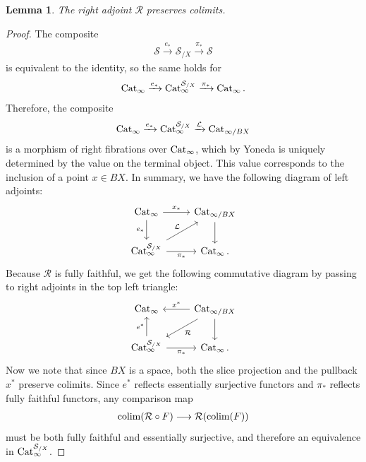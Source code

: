 \documentclass[10pt]{amsart}
\numberwithin{equation}{section}
\newtheorem{lem}[prop]{Lemma}
\theoremstyle{definition}
\DeclareMathOperator*{\colim}{colim}
\newcommand{\Cat}{\mathrm{Cat}\vphantom{t}}
\newcommand{\cS}{\mathcal{S}}
\newcommand{\cL}{\mathcal{L}}
\newcommand{\cR}{\mathcal{R}}
\renewcommand{\to}{\mathchoice{\longrightarrow}{\rightarrow}{}{}}
\begin{document}
	\begin{lem}\label{lem:monoid_right_adjoint_2}
		The right adjoint $\cR$ preserves colimits.
	\end{lem}
	\begin{proof}
		The composite
		\begin{align*}
			\cS \xrightarrow{e_{*}} \cS_{/X} \xrightarrow{\pi_{*}} \cS
		\end{align*}
		is equivalent to the identity, so the same holds for
		\begin{align*}
			\Cat_{\infty}\xrightarrow{e_{*}} \Cat_{\infty}^{\cS_{/X}} \xrightarrow{\pi_{*}} \Cat_{\infty} \,.
		\end{align*}
		Therefore, the composite
		\begin{align*}
			\Cat_{\infty} \xrightarrow{e_{*}} \Cat_{\infty}^{\cS_{/X}} \xrightarrow{\cL} \Cat_{\infty /BX}
		\end{align*}
		is a morphism of right fibrations over $\Cat_{\infty}$, which by Yoneda is uniquely determined by the value on the terminal object.
    This value corresponds to the inclusion of a point $x\in BX$.
    In summary, we have the following diagram of left adjoints:
		\begin{equation*}
			\begin{tikzcd}
				\Cat_{\infty} \arrow[r, "x_{*}"] \arrow[d, "e_{*}"']      &   \Cat_{\infty /BX}  \arrow[d] \\
				\Cat_{\infty}^{\cS_{/X}}  \arrow[r, "\pi_{*}"']    \arrow[ur, "\cL"]           &  \Cat_{\infty} \,.
			\end{tikzcd}
		\end{equation*}
		Because $\cR$ is fully faithful, we get the following commutative diagram by passing to right adjoints in the top left triangle:
		\begin{equation*}
			\begin{tikzcd}
				\Cat_{\infty} & \Cat_{\infty /BX} \arrow[l, "x^{*}"'] \arrow[dl, "\cR"] \arrow[d] \\
				\Cat^{\cS_{/X}}_{\infty} \arrow[u, "e^{*}"] \arrow[r, "\pi_{*}"'] & \Cat_{\infty} \,.
			\end{tikzcd}
		\end{equation*}
		Now we note that since $BX$ is a space, both the slice projection and the pullback $x^{*}$ preserve colimits.
    Since $e^{*}$ reflects essentially surjective functors and $\pi_{*}$ reflects fully faithful functors, any comparison map
		\begin{align*}
			\colim(\cR \circ F) \to \cR( \colim(F))
		\end{align*}
		must be both fully faithful and essentially surjective, and therefore an equivalence in $\Cat^{\cS_{/X}}_{\infty}$.
	\end{proof}
\end{document}
